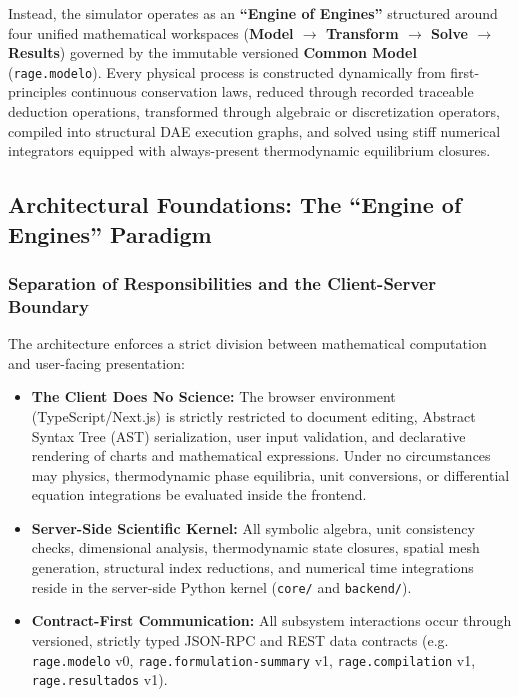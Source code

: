 \documentclass[11pt,a4paper]{article}
\begin{document}
Instead, the simulator operates as an \textbf{``Engine of Engines''} structured around four unified mathematical workspaces (\textbf{Model $\to$ Transform $\to$ Solve $\to$ Results}) governed by the immutable versioned \textbf{Common Model} (\texttt{rage.modelo}). Every physical process is constructed dynamically from first-principles continuous conservation laws, reduced through recorded traceable deduction operations, transformed through algebraic or discretization operators, compiled into structural DAE execution graphs, and solved using stiff numerical integrators equipped with always-present thermodynamic equilibrium closures.

\subsection{Architectural Foundations: The ``Engine of Engines'' Paradigm}
\label{subsec:engine-of-engines}

\subsubsection{Separation of Responsibilities and the Client-Server Boundary}
The architecture enforces a strict division between mathematical computation and user-facing presentation:
\begin{itemize}[leftmargin=*]
    \item \textbf{The Client Does No Science:} The browser environment (TypeScript/Next.js) is strictly restricted to document editing, Abstract Syntax Tree (AST) serialization, user input validation, and declarative rendering of charts and mathematical expressions. Under no circumstances may physics, thermodynamic phase equilibria, unit conversions, or differential equation integrations be evaluated inside the frontend.
    \item \textbf{Server-Side Scientific Kernel:} All symbolic algebra, unit consistency checks, dimensional analysis, thermodynamic state closures, spatial mesh generation, structural index reductions, and numerical time integrations reside in the server-side Python kernel (\texttt{core/} and \texttt{backend/}).
    \item \textbf{Contract-First Communication:} All subsystem interactions occur through versioned, strictly typed JSON-RPC and REST data contracts (e.g. \texttt{rage.modelo} v0, \texttt{rage.formulation-summary} v1, \texttt{rage.compilation} v1, \texttt{rage.resultados} v1).
\end{itemize}
\end{document}
